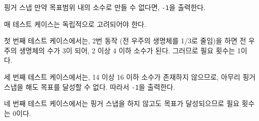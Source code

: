 \begin{problem}{핑거 스냅}
    만약 목표범위 내의 소수로 만들 수 없다면, \verb|-1|을 출력한다.
    
    매 테스트 케이스는 독립적으로 고려되어야 한다.
    
    \Examples
    
    \begin{example}
    \end{example}
    
    \Explanation
    첫 번째 테스트 케이스에서는, 2번 동작 (전 우주의 생명체를 1/3로 줄임)을 하면 전 우주의 생명체의 수가 3이 되어, 2 이상 4 이하 소수가 된다. 그러므로 필요 횟수는 1이다.
    
    세 번째 테스트 케이스에서는, 14 이상 16 이하 소수가 존재하지 않으므로, 아무리 핑거 스냅을 해도 목표를 달성할 수 없다. 따라서 \verb|-1|을 출력한다.
    
    네 번째 테스트 케이스에서는 핑거 스냅을 하지 않고도 목표가 달성되으므로 필요 횟수는 0이다.
    
\end{problem}

